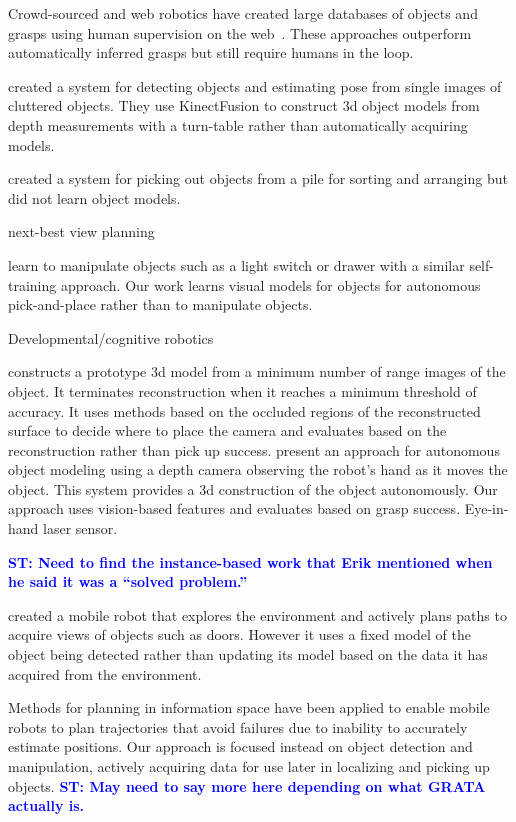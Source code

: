 \documentclass[graybox]{svmult}
\newcommand{\stnote}[1]{\textcolor{blue}{\textbf{ST: #1}}}
\begin{document}
Crowd-sourced and web robotics have created large databases of objects
and grasps using human supervision on the web~\citep{kent14a, kent14}.
These approaches outperform automatically inferred grasps but still
require humans in the loop.

\citet{zhu14} created a system for detecting objects and estimating
pose from single images of cluttered objects.  They use KinectFusion
to construct 3d object models from depth measurements with a
turn-table rather than automatically acquiring models.

\citet{chang12} created a system for picking out objects from a pile
for sorting and arranging but did not learn object models.  

next-best view planning~\citep{kriegel11}

\citet{nguyen14} learn to manipulate objects such as a light switch or
drawer with a similar self-training approach.  Our work learns visual
models for objects for autonomous pick-and-place rather than to
manipulate objects.

Developmental/cognitive robotics~\citep{lyubova13, kraft10r}

\citet{banta00} constructs a prototype 3d model from a minimum number
of range images of the object.  It terminates reconstruction when it
reaches a minimum threshold of accuracy.  It uses methods based on the
occluded regions of the reconstructed surface to decide where to place
the camera and evaluates based on the reconstruction rather than pick
up success.  \citet{krainin11} present an approach for autonomous
object modeling using a depth camera observing the robot's hand as it
moves the object.  This system provides a 3d construction of the
object autonomously.  Our approach uses vision-based features and
evaluates based on grasp success.  Eye-in-hand laser
sensor.~\citep{aeotti14}

\stnote{Need to find the instance-based work that Erik mentioned when
  he said it was a ``solved problem.''}

\citet{velez11} created a mobile robot that explores the environment
and actively plans paths to acquire views of objects such as doors.
However it uses a fixed model of the object being detected rather than
updating its model based on the data it has acquired from the
environment.

Methods for planning in information space \citep{he08, atanasov13,
  prentice09} have been applied to enable mobile robots to plan
trajectories that avoid failures due to inability to accurately
estimate positions.  Our approach is focused instead on
object detection and manipulation, actively acquiring data for use
later in localizing and picking up objects. \stnote{May need to say
  more here depending on what GRATA actually is.}
\end{document}
